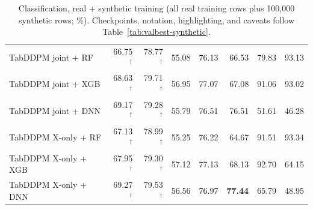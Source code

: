 \begin{table}[p]
\begin{tabular}{@{}lrrrrrrr@{}}
TabDDPM joint + RF & 66.75$^{\dagger}$ & 78.77$^{\dagger}$ & 55.08 & 76.13 & 66.53 & 79.83 & 93.13 \\
TabDDPM joint + XGB & 68.63$^{\dagger}$ & 79.71$^{\dagger}$ & 56.95 & 77.07 & 67.08 & 91.06 & 93.02 \\
TabDDPM joint + DNN & 69.17$^{\dagger}$ & 79.28$^{\dagger}$ & 55.79 & 76.51 & 76.51 & 51.61 & 46.28 \\
TabDDPM X-only + RF & 67.13$^{\dagger}$ & 78.99$^{\dagger}$ & 55.25 & 76.22 & 64.67 & 91.51 & 93.34 \\
TabDDPM X-only + XGB & 67.95$^{\dagger}$ & 79.30$^{\dagger}$ & 57.12 & 77.13 & 68.13 & 92.70 & 64.15 \\
TabDDPM X-only + DNN & 69.27$^{\dagger}$ & 79.53$^{\dagger}$ & 56.56 & 76.97 & \textbf{77.44} & 65.79 & 48.95 \\
\bottomrule
\end{tabular}
\caption{Classification, real + synthetic training (all real training rows plus 100,000 synthetic rows; \%). Checkpoints, notation, highlighting, and caveats follow Table~\ref{tab:valbest-synthetic}.}
\label{tab:valbest-mix}
\end{table}
